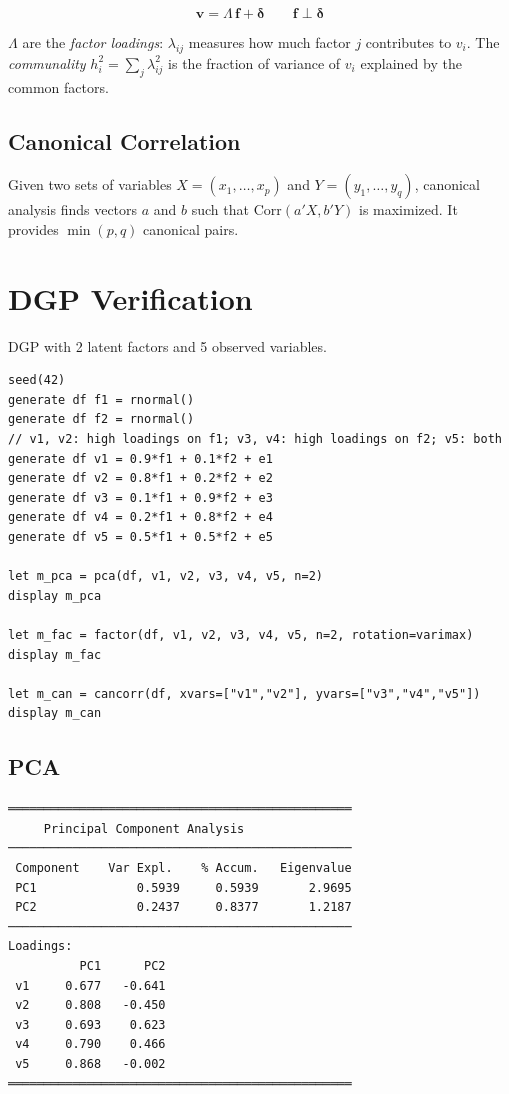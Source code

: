 \[
  \mathbf{v} = \Lambda\,\mathbf{f} + \boldsymbol{\delta}
  \qquad \mathbf{f} \perp \boldsymbol{\delta}
\]

$\Lambda$ are the \emph{factor loadings}: $\lambda_{ij}$ measures how much
factor $j$ contributes to $v_i$. The \emph{communality} $h_i^2 = \sum_j \lambda_{ij}^2$
is the fraction of variance of $v_i$ explained by the common factors.

\subsection*{Canonical Correlation}

Given two sets of variables $X = (x_1,\ldots,x_p)$ and $Y = (y_1,\ldots,y_q)$,
canonical analysis finds vectors $a$ and $b$ such that $\mathrm{Corr}(a'X, b'Y)$
is maximized. It provides $\min(p,q)$ canonical pairs.

\section{DGP Verification}

DGP with 2 latent factors and 5 observed variables.

\begin{lstlisting}[caption={Factorial DGP and multivariate analysis}]
seed(42)
generate df f1 = rnormal()
generate df f2 = rnormal()
// v1, v2: high loadings on f1; v3, v4: high loadings on f2; v5: both
generate df v1 = 0.9*f1 + 0.1*f2 + e1
generate df v2 = 0.8*f1 + 0.2*f2 + e2
generate df v3 = 0.1*f1 + 0.9*f2 + e3
generate df v4 = 0.2*f1 + 0.8*f2 + e4
generate df v5 = 0.5*f1 + 0.5*f2 + e5

let m_pca = pca(df, v1, v2, v3, v4, v5, n=2)
display m_pca

let m_fac = factor(df, v1, v2, v3, v4, v5, n=2, rotation=varimax)
display m_fac

let m_can = cancorr(df, xvars=["v1","v2"], yvars=["v3","v4","v5"])
display m_can
\end{lstlisting}

\subsection*{PCA}

\begin{lstlisting}[language={}, basicstyle=\ttfamily\small,
  frame=none, numbers=none, backgroundcolor=\color{codbg},
  xleftmargin=0pt, xrightmargin=0pt, breaklines=false]
════════════════════════════════════════════════
     Principal Component Analysis
────────────────────────────────────────────────
 Component    Var Expl.    % Accum.   Eigenvalue
 PC1              0.5939     0.5939       2.9695
 PC2              0.2437     0.8377       1.2187
────────────────────────────────────────────────
Loadings:
          PC1      PC2
 v1     0.677   -0.641
 v2     0.808   -0.450
 v3     0.693    0.623
 v4     0.790    0.466
 v5     0.868   -0.002
════════════════════════════════════════════════
\end{lstlisting}

